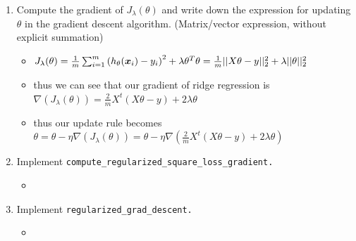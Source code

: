 \documentclass{article}
\begin{document}
\begin{enumerate}
\setcounter{enumi}{\value{saveenum}}
\item Compute the gradient of $J_\lambda(\theta)$ and write down the expression
for updating $\theta$ in the gradient descent algorithm. (Matrix/vector
expression, without explicit summation)
\begin{itemize}
    \item $J_\lambda(\theta)=\frac{1}{m}\sum_{i=1}^{m}\left(h_{\theta}(\boldsymbol{x}_{i})-y_{i}\right)^{2}+\lambda\theta^{T}\theta=\frac{1}{m}||X\theta -y||_{2}^{2}+\lambda||\theta||_{2}^{2}$
    \item thus we can see that our gradient of ridge regression is $\nabla (J_{\lambda}(\theta))=\frac{2}{m}X^t(X\theta-y)+2\lambda\theta$
    \item thus our update rule becomes $\theta=\theta-\eta \nabla(J_{\lambda}(\theta))=\theta-\eta \nabla(\frac{2}{m}X^t(X\theta-y)+2\lambda\theta)$
\end{itemize}

\item Implement \texttt{compute\_regularized\_square\_loss\_gradient.}
\begin{itemize}
    \item \inputminted[firstline=182, lastline=198, breaklines=True]{python}{HW_2.PY.py}
\end{itemize}

    \item Implement \texttt{regularized\_grad\_descent.}
    \begin{itemize}
    \item \inputminted[firstline=203, lastline=228, breaklines=True]{python}{HW_2.PY.py}
\end{itemize}

\setcounter{saveenum}{\value{enumi}}
\end{enumerate}
\end{document}
